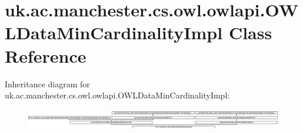 \hypertarget{classuk_1_1ac_1_1manchester_1_1cs_1_1owl_1_1owlapi_1_1_o_w_l_data_min_cardinality_impl}{\section{uk.\-ac.\-manchester.\-cs.\-owl.\-owlapi.\-O\-W\-L\-Data\-Min\-Cardinality\-Impl Class Reference}
\label{classuk_1_1ac_1_1manchester_1_1cs_1_1owl_1_1owlapi_1_1_o_w_l_data_min_cardinality_impl}
}
Inheritance diagram for uk.\-ac.\-manchester.\-cs.\-owl.\-owlapi.\-O\-W\-L\-Data\-Min\-Cardinality\-Impl\-:\begin{figure}[H]
\begin{center}
\leavevmode
\includegraphics[height=0.965934cm]{classuk_1_1ac_1_1manchester_1_1cs_1_1owl_1_1owlapi_1_1_o_w_l_data_min_cardinality_impl}
\end{center}
\end{figure}
